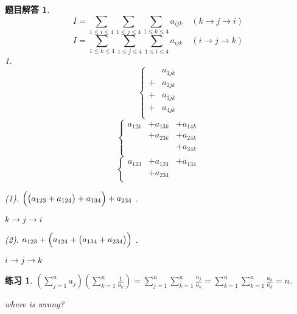 \documentclass[mode=geye]{elegantnote}
\newtheorem{exercise}{练习}
\newtheorem{answer}{题目解答}
\begin{document}
\begin{answer}
    \begin{equation}
        I = 
        \sum_{1\leqslant i\leqslant 4}
        \sum_{1\leqslant j\leqslant 4}
        \sum_{1\leqslant k\leqslant 4}
        a_{ijk}
        \quad (k\rightarrow j\rightarrow i)
    \end{equation}
    \begin{equation}
        I = 
        \sum_{1\leqslant k\leqslant 4}
        \sum_{1\leqslant j\leqslant 4}
        \sum_{1\leqslant i\leqslant 4}
        a_{ijk}
        \quad (i\rightarrow j\rightarrow k)
    \end{equation}
    1.
    \begin{equation*}
        \left\{
            \begin{array}{ll}
                 & a_{1jk} \\
                +& a_{2jk} \\
                +& a_{3jk} \\
                +& a_{4jk} \\
            \end{array}
        \right.
    \end{equation*}
    \begin{equation*}
        \left\{
            \begin{array}{lll}
                a_{12k} &+ a_{13k} &+ a_{14k} \\
                &+ a_{23k} &+ a_{24k} \\
                &          &+ a_{34k} \\
            \end{array}
        \right.
    \end{equation*}
    \begin{equation*}
        \left\{
            \begin{array}{lll}
                a_{123} &+a_{124} &+a_{134} \\
                &+a_{234}& \\
            \end{array}
        \right.
    \end{equation*}

    (1). $ \Bigl(\bigl(a_{123}+a_{124}\bigr)+a_{134}\Bigr)+a_{234} $ .
    
    $ k\rightarrow j\rightarrow i $ 

    (2). $ a_{123}+\Bigl(a_{124}+\bigl(a_{134}+a_{234}\bigr)\Bigr) $ .
    
    $ i\rightarrow j\rightarrow k $ 
\end{answer}

\begin{exercise}
    $\left( \sum_{j=1}^{n}a_j \right) \left( \sum_{k=1}^{n}\frac{1}{a_k}\right) = \sum_{j=1}^{n}\sum_{k=1}^{n}\frac{a_j}{a_k} = \sum_{k=1}^{n}\sum_{k=1}^{n}\frac{a_k}{a_k}=n$.

    where is wrong?
\end{exercise}
\end{document}
